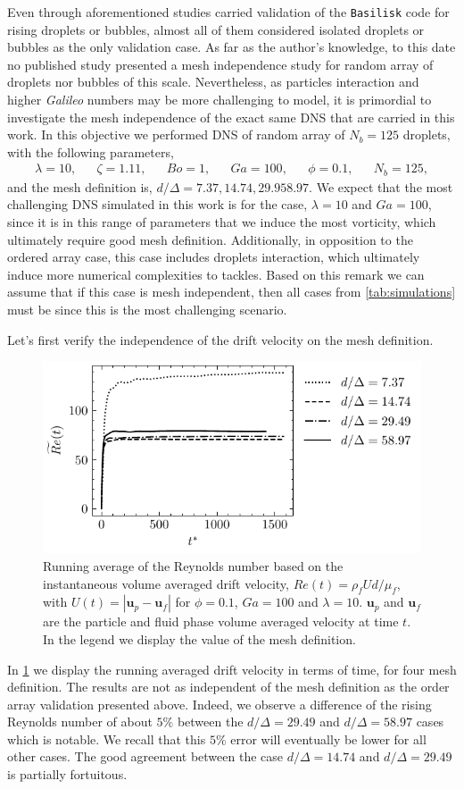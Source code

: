 Even through aforementioned studies carried validation of the \texttt{Basilisk} code for rising droplets or bubbles, almost all of them considered isolated droplets or bubbles as the only validation case. 
As far as the author's knowledge, to this date no published study presented a mesh independence study for random array of droplets nor bubbles of this scale. 
Nevertheless, as particles interaction and higher \textit{Galileo} numbers may be more challenging to model, it is primordial to investigate the mesh independence of the exact same DNS that are carried in this work. 
In this objective we performed DNS of random array of $N_b=125$ droplets, with the following parameters,
\begin{align*}
    \lambda = 10,
    && \zeta = 1.11,
    && Bo = 1,
    && Ga = 100,
    && \phi = 0.1,
    && N_b =125,
\end{align*}
and the mesh definition is, $d/\Delta = 7.37, 14.74, 29.9 58.97$. 
We expect that the most challenging DNS simulated in this work is for the case, $\lambda = 10$ and $Ga = 100$, since it is in this range of parameters that we induce the most vorticity, which ultimately require good mesh definition. 
Additionally, in opposition to the ordered array case, this case includes droplets interaction, which ultimately induce more numerical complexities to tackles. 
Based on this remark we can assume that if this case is mesh independent, then all cases from \ref{tab:simulations} must be since this is the most challenging scenario.   

Let's first verify the independence of the drift velocity on the mesh definition. 
\begin{figure}[h!]
    \centering
    \includegraphics[height = 0.3\textwidth]{image/HOMOGENEOUS_NEW/VAL/Re.pdf}
    \caption{
        Running average of the Reynolds number based on the instantaneous volume averaged drift velocity, $Re(t) = \rho_fU d /\mu_f$, with $U(t) = |\textbf{u}_p - \textbf{u}_f|$ for $\phi = 0.1$, $Ga=100$ and $\lambda =10$.
        $\textbf{u}_p$ and $\textbf{u}_f$ are the particle and fluid phase volume averaged velocity at time $t$.
        In the legend we display the value of the mesh definition. 
    }
    \label{fig:Re}
\end{figure}
In \ref{fig:Re} we display the running averaged drift velocity in terms of time, for four mesh definition. 
The results are not as independent of the mesh definition as the order array validation presented above. 
Indeed, we observe a difference of the rising Reynolds number of about $5\%$ between the $d/\Delta = 29.49$ and $d/\Delta = 58.97$ cases which is notable.
We recall that this $5\%$ error will eventually be lower for all other cases. 
The good agreement between the case  $d/\Delta = 14.74$ and $d/\Delta = 29.49$ is partially fortuitous.

